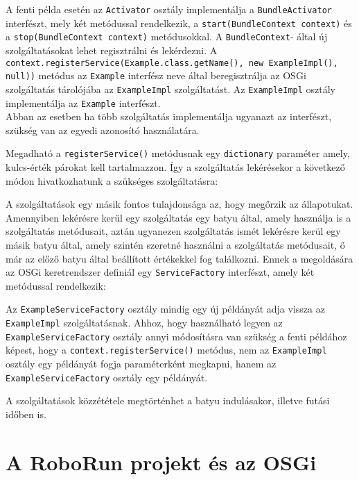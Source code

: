 A fenti példa esetén az \texttt{Activator} osztály implementálja a \texttt{BundleActivator} interfészt, mely két metódussal rendelkezik, a \texttt{start(BundleContext context)} és a \texttt{stop(BundleContext context)} metódusokkal. A \texttt{BundleContext}- által új szolgáltatásokat lehet regisztrálni és lekérdezni. A \texttt{context.registerService(Example.class.getName(), new ExampleImpl(), null))} metódus az \texttt{Example} interfész neve által beregisztrálja az OSGi szolgáltatás tárolójába az \texttt{ExampleImpl} szolgáltatást. Az \texttt{ExampleImpl} osztály implementálja az \texttt{Example} interfészt.
\\Abban az esetben ha több szolgáltatás implementálja ugyanazt az interfészt, szükség van az egyedi azonosító használatára.
\lstset{language=Java}

Megadható a \texttt{registerService()} metódusnak egy \texttt{dictionary} paraméter amely, kulcs-érték párokat kell tartalmazzon. Így a szolgáltatás lekérésekor a következő módon hivatkozhatunk a szükséges szolgáltatásra:
\lstset{language=Java}

A szolgáltatások egy másik fontos tulajdonsága az, hogy megőrzik az állapotukat. Amennyiben lekérésre kerül egy szolgáltatás egy batyu által, amely használja is a szolgáltatás metódusait, aztán ugyanezen szolgáltatás ismét lekérésre kerül egy másik batyu által, amely szintén szeretné használni a szolgáltatás metódusait, ő már az előző batyu által beállított értékekkel fog találkozni. Ennek a megoldására az OSGi keretrendszer definiál egy \texttt{ServiceFactory} interfészt, amely két metódussal rendelkezik:
\lstset{language=Java}

Az \texttt{ExampleServiceFactory} osztály mindig egy új példányát adja vissza az \texttt{ExampleImpl} szolgáltatásnak. Ahhoz, hogy használható legyen az \texttt{ExampleServiceFactory} osztály annyi módosításra van szükség a fenti példához képest, hogy a \texttt{context.registerService()} metódus, nem az \texttt{ExampleImpl} osztály egy példányát fogja paraméterként megkapni, hanem az \texttt{ExampleServiceFactory} osztály egy példányát.
\lstset{language=Java}

A szolgáltatások közzététele megtörténhet a batyu indulásakor, illetve futási időben is.

\section{A RoboRun projekt és az OSGi}\label{sec:RoboRun és OSGi}

